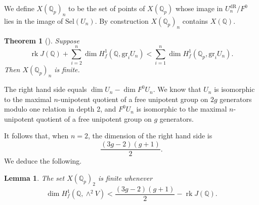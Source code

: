 \documentclass[11pt]{amsart}
\def\Q{\mathbb Q}
\theoremstyle{plain}
\newtheorem{theorem}{Theorem}
\newtheorem{lemma}{Lemma}
\theoremstyle{definition}
\newcommand{\dR}{\mathrm{dR}}
\newcommand{\Sel}{\mathrm{Sel}}
\newcommand{\Jac}{\mathrm{Jac}}
\DeclareMathOperator{\rk}{rk}
\newcommand{\gr}{\mathrm{gr}}
\begin{document}
We define $X(\Q _p )_n$ to be the set of points of $X(\Q _p )$ whose image in $U_n ^{\dR}/F^0 $ lies in the image of $\Sel (U_n )$. By construction $X(\Q _p )_n$ contains $X(\Q )$.
\begin{theorem}[\cite{kim:chabauty}]
Suppose 
\[
\rk J(\Q ) +\sum _{i=2}^n \dim H^1 _f (\Q  ,\gr _i U_n ) <\sum _{i=1}^n \dim H^1 _f (\Q _p ,\gr _i U_n ).
\]
Then $X(\Q _p )_n$ is finite.
\end{theorem}
The right hand side equals $\dim U_n -\dim F^0 U_n $. We know that $U_n$ is isomorphic to the maximal $n$-unipotent quotient of a free unipotent group on $2g$ generators modulo one relation in depth 2, and $F^0 U_n$ is isomorphic to the maximal $n$-unipotent quotient of a free unipotent group on $g$ generators.

It follows that, when $n=2$, the dimension of the right hand side is
\[
\frac{(3g-2)(g+1)}{2}.
\]
We deduce the following.
\begin{lemma}
The set $X(\Q _p )_2 $ is finite whenever
\[
\dim H^1 _f (\Q ,\wedge ^2 V)<\frac{(3g-2)(g+1)}{2}-\rk J(\Q ).
\]
\end{lemma}
\end{document}
